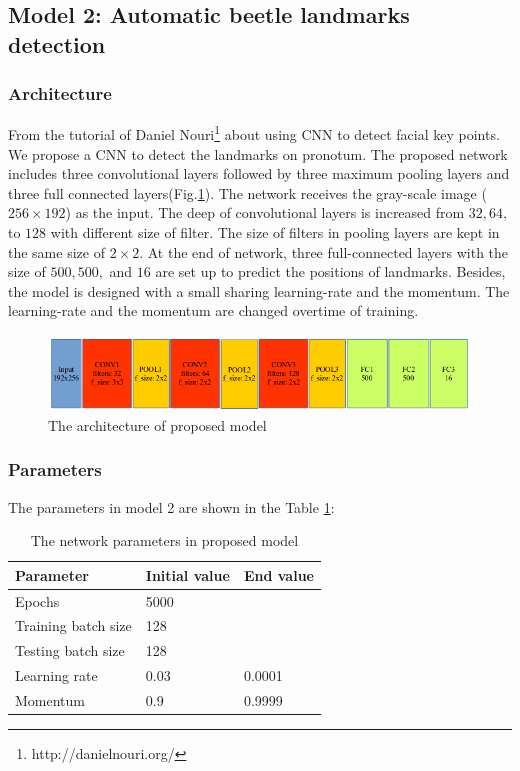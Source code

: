 \documentclass[12pt,a4paper]{article}
\begin{document}
\subsection{Model 2: Automatic beetle landmarks detection}
\subsubsection{Architecture}
From the tutorial of Daniel Nouri\footnote{http://danielnouri.org/} about using CNN to detect facial key points. We propose a CNN to detect the landmarks on pronotum. The proposed network includes three convolutional layers followed by three maximum pooling layers and three full connected layers(Fig.\ref{pmodel}). The network receives the gray-scale image ($256 \times 192$) as the input. The deep of convolutional layers is increased from $32, 64, $ to $ 128$ with different size of filter. The size of filters in pooling layers are kept in the same size of $2 \times 2$. At the end of network, three full-connected layers with the size of $500, 500, $ and $16$ are set up to predict the positions of landmarks. Besides, the model is designed with a small sharing learning-rate and the momentum. The learning-rate and the momentum are changed overtime of training.
\begin{figure}[h!]
	\centering
	\includegraphics[scale=0.45]{images/model3}
	\caption{The architecture of proposed model}
	\label{pmodel}
\end{figure}
\subsubsection{Parameters}
The parameters in model 2 are shown in the Table \ref{model2parameters}:
\begin{table}[h!]
	\centering
	\begin{tabular}{l l l}
	Parameter & Initial value & End value \\ \hline
	Epochs & 5000 &  \\ \hline
	Training batch size & 128 & \\ \hline
	Testing batch size & 128 & \\ \hline
	Learning rate & 0.03 & 0.0001 \\ \hline
	Momentum & 0.9 & 0.9999 \\ \hline
	\end{tabular}
	\caption{The network parameters in proposed model}
	\label{model2parameters}
\end{table}
\end{document}
